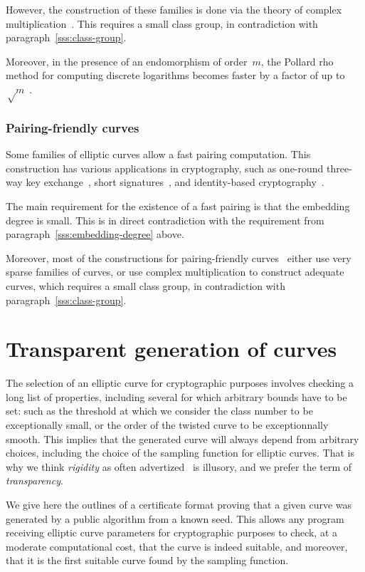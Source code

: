 \documentclass[twocolumn,letterpaper]{article}
\begin{document}
However, the construction of these families
is done via the theory of complex multiplication~\cite{asia2013smith}.
This requires a small class group,
in contradiction with paragraph~\ref{sss:class-group}.

Moreover, in the presence of an endomorphism of order~$m$,
the Pollard rho method for computing discrete logarithms
becomes faster by a factor of up to~$√m$~\cite{asia1999dgm,moc2000glv}.

\subsubsection{Pairing-friendly curves}
\label{sss:pairing}

Some families of elliptic curves allow a fast pairing computation.
This construction has various applications in cryptography,
such as one-round three-way key exchange~\cite{jc2004joux},
short signatures~\cite{jc2004bls},
and identity-based cryptography~\cite{crypto2001bf,el2002paterson}.

The main requirement for the existence of a fast pairing
is that the embedding degree is small.
This is in direct contradiction with
the requirement from paragraph~\ref{sss:embedding-degree} above.

Moreover, most of the constructions
for pairing-friendly curves~\cite{jc2010fst,space2014em}
either use very sparse families of curves,
or use complex multiplication to construct adequate curves,
which requires a small class group,
in contradiction with paragraph~\ref{sss:class-group}.

\section{Transparent generation of curves}
\label{s:certif}

The selection of an elliptic curve for cryptographic purposes
involves checking a long list of properties,
including several for which arbitrary bounds have to be set:
such as the threshold at which we consider the class number
to be exceptionally small,
or the order of the twisted curve to be exceptionnally smooth.
This implies that the generated curve
will always depend from arbitrary choices,
including the choice of the sampling function for elliptic curves.
That is why we think \emph{rigidity} as often advertized~\cite{safecurves}
is illusory, and we prefer the term of \emph{transparency}.

We give here the outlines of a certificate format
proving that a given curve was generated by a public algorithm
from a known seed.
This allows any program receiving elliptic curve parameters
for cryptographic purposes
to check, at a moderate computational cost,
that the curve is indeed suitable,
and moreover, that it is the first suitable curve
found by the sampling function.
\end{document}
